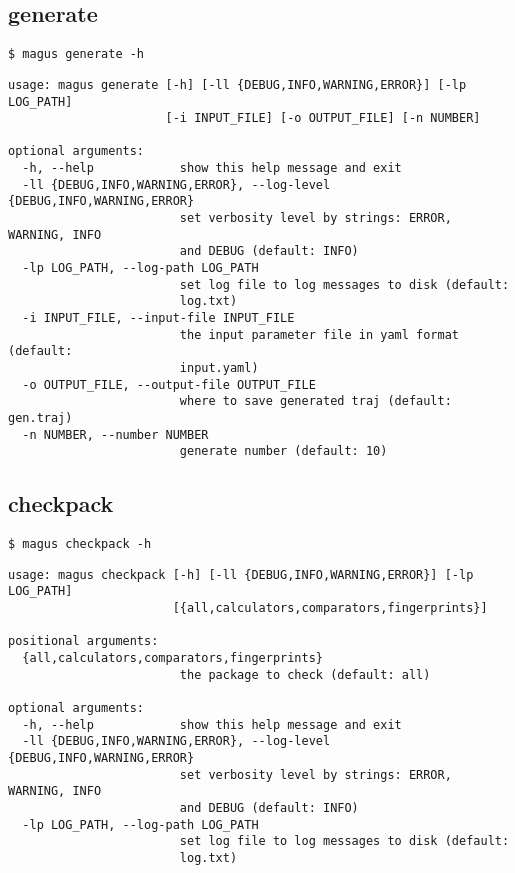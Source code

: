 \documentclass[12pt,oneside]{book}
\begin{document}
\subsection{generate}
\begin{tcolorbox}
    \begin{verbatim}                 
$ magus generate -h
    \end{verbatim}
    \tcblower
    \begin{verbatim}
usage: magus generate [-h] [-ll {DEBUG,INFO,WARNING,ERROR}] [-lp LOG_PATH]
                      [-i INPUT_FILE] [-o OUTPUT_FILE] [-n NUMBER]

optional arguments:
  -h, --help            show this help message and exit
  -ll {DEBUG,INFO,WARNING,ERROR}, --log-level {DEBUG,INFO,WARNING,ERROR}
                        set verbosity level by strings: ERROR, WARNING, INFO
                        and DEBUG (default: INFO)
  -lp LOG_PATH, --log-path LOG_PATH
                        set log file to log messages to disk (default:
                        log.txt)
  -i INPUT_FILE, --input-file INPUT_FILE
                        the input parameter file in yaml format (default:
                        input.yaml)
  -o OUTPUT_FILE, --output-file OUTPUT_FILE
                        where to save generated traj (default: gen.traj)
  -n NUMBER, --number NUMBER
                        generate number (default: 10)
    \end{verbatim}
\end{tcolorbox}
\subsection{checkpack}
\begin{tcolorbox}
    \begin{verbatim}
$ magus checkpack -h
    \end{verbatim}
    \tcblower
    \begin{verbatim}
usage: magus checkpack [-h] [-ll {DEBUG,INFO,WARNING,ERROR}] [-lp LOG_PATH]
                       [{all,calculators,comparators,fingerprints}]

positional arguments:
  {all,calculators,comparators,fingerprints}
                        the package to check (default: all)

optional arguments:
  -h, --help            show this help message and exit
  -ll {DEBUG,INFO,WARNING,ERROR}, --log-level {DEBUG,INFO,WARNING,ERROR}
                        set verbosity level by strings: ERROR, WARNING, INFO
                        and DEBUG (default: INFO)
  -lp LOG_PATH, --log-path LOG_PATH
                        set log file to log messages to disk (default:
                        log.txt)
    \end{verbatim}
\end{tcolorbox}
\end{document}
